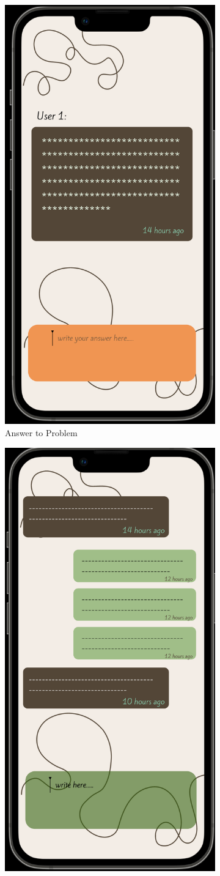 \begin{figure}[ht]
\begin{subfigure}[b]{0.6\linewidth}
    \includegraphics[width=0.6\linewidth]{figures/answertoproblem.png} 
    \caption{Answer to Problem} 
    \label{fig:b} 
    \vspace{4ex}
  \end{subfigure} 
  \begin{subfigure}[b]{0.6\linewidth}
    \centering
    \includegraphics[width=0.6\linewidth]{figures/answertodiscussions.png} 

\end{subfigure}
\end{figure}
